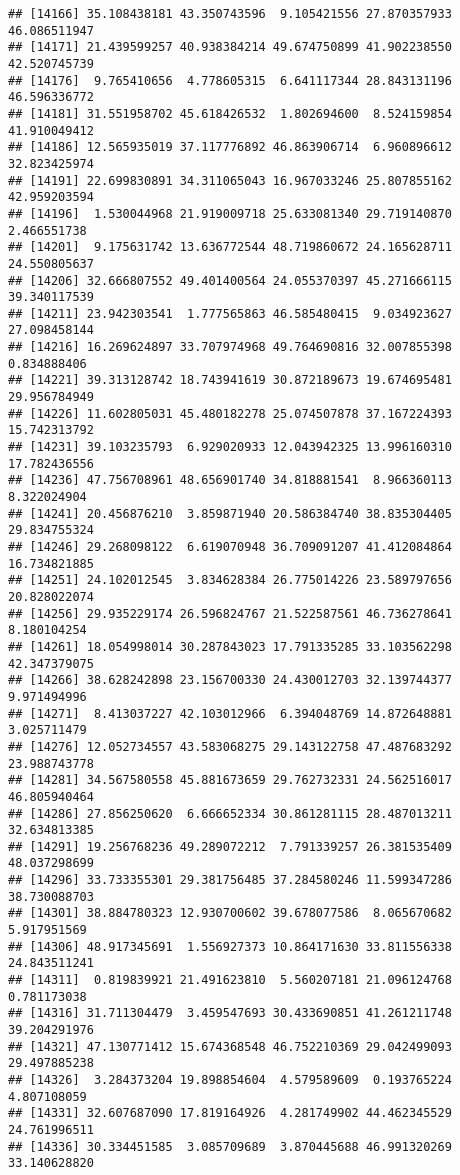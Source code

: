 \documentclass[
]{article}
\begin{document}
\begin{verbatim}
## [14166] 35.108438181 43.350743596  9.105421556 27.870357933 46.086511947
## [14171] 21.439599257 40.938384214 49.674750899 41.902238550 42.520745739
## [14176]  9.765410656  4.778605315  6.641117344 28.843131196 46.596336772
## [14181] 31.551958702 45.618426532  1.802694600  8.524159854 41.910049412
## [14186] 12.565935019 37.117776892 46.863906714  6.960896612 32.823425974
## [14191] 22.699830891 34.311065043 16.967033246 25.807855162 42.959203594
## [14196]  1.530044968 21.919009718 25.633081340 29.719140870  2.466551738
## [14201]  9.175631742 13.636772544 48.719860672 24.165628711 24.550805637
## [14206] 32.666807552 49.401400564 24.055370397 45.271666115 39.340117539
## [14211] 23.942303541  1.777565863 46.585480415  9.034923627 27.098458144
## [14216] 16.269624897 33.707974968 49.764690816 32.007855398  0.834888406
## [14221] 39.313128742 18.743941619 30.872189673 19.674695481 29.956784949
## [14226] 11.602805031 45.480182278 25.074507878 37.167224393 15.742313792
## [14231] 39.103235793  6.929020933 12.043942325 13.996160310 17.782436556
## [14236] 47.756708961 48.656901740 34.818881541  8.966360113  8.322024904
## [14241] 20.456876210  3.859871940 20.586384740 38.835304405 29.834755324
## [14246] 29.268098122  6.619070948 36.709091207 41.412084864 16.734821885
## [14251] 24.102012545  3.834628384 26.775014226 23.589797656 20.828022074
## [14256] 29.935229174 26.596824767 21.522587561 46.736278641  8.180104254
## [14261] 18.054998014 30.287843023 17.791335285 33.103562298 42.347379075
## [14266] 38.628242898 23.156700330 24.430012703 32.139744377  9.971494996
## [14271]  8.413037227 42.103012966  6.394048769 14.872648881  3.025711479
## [14276] 12.052734557 43.583068275 29.143122758 47.487683292 23.988743778
## [14281] 34.567580558 45.881673659 29.762732331 24.562516017 46.805940464
## [14286] 27.856250620  6.666652334 30.861281115 28.487013211 32.634813385
## [14291] 19.256768236 49.289072212  7.791339257 26.381535409 48.037298699
## [14296] 33.733355301 29.381756485 37.284580246 11.599347286 38.730088703
## [14301] 38.884780323 12.930700602 39.678077586  8.065670682  5.917951569
## [14306] 48.917345691  1.556927373 10.864171630 33.811556338 24.843511241
## [14311]  0.819839921 21.491623810  5.560207181 21.096124768  0.781173038
## [14316] 31.711304479  3.459547693 30.433690851 41.261211748 39.204291976
## [14321] 47.130771412 15.674368548 46.752210369 29.042499093 29.497885238
## [14326]  3.284373204 19.898854604  4.579589609  0.193765224  4.807108059
## [14331] 32.607687090 17.819164926  4.281749902 44.462345529 24.761996511
## [14336] 30.334451585  3.085709689  3.870445688 46.991320269 33.140628820

\end{verbatim}
\end{document}

